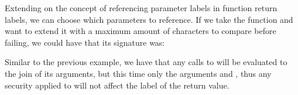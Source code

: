 Extending on the concept of referencing parameter labels in function return labels, we can choose which parameters to reference.
If we take the function  and want to extend it with a maximum amount of characters to compare before failing, we could have that its signature was:\\
\begin{minipage}{\linewidth}
  \centering
\end{minipage}
Similar to the previous example, we have that any calls to  will be evaluated to the join of its arguments, but this time only the arguments  and , thus any security applied to  will not affect the label of the return value.
